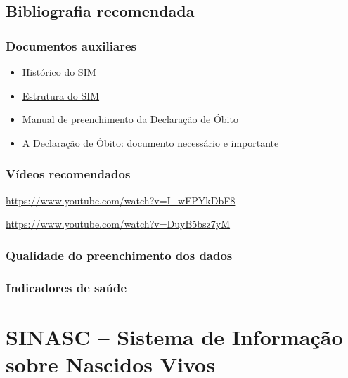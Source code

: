 \documentclass[
  letterpaper,
  DIV=11,
  numbers=noendperiod]{scrreprt}
\providecommand{\tightlist}{%
  \setlength{\itemsep}{0pt}\setlength{\parskip}{0pt}}\usepackage{longtable,booktabs,array}
\begin{document}
\section{Bibliografia recomendada}\label{bibliografia-recomendada}

\subsection{Documentos auxiliares}\label{documentos-auxiliares}

\begin{itemize}
\tightlist
\item
  \href{assets/sim/INTRO.pdf}{Histórico do SIM}
\item
  \href{assets/sim/Estrutura_SIM_para_CD.pdf}{Estrutura do SIM}
\item
  \href{assets/sim/declaracao-obito-manual-instrucoes-preenchimento.pdf}{Manual
  de preenchimento da Declaração de Óbito}
\item
  \href{assets/sim/a-declaracao-de-obito-documento-necessario-e-importante.pdf}{A
  Declaração de Óbito: documento necessário e importante}
\end{itemize}

\subsection{Vídeos recomendados}\label{vuxeddeos-recomendados}

\url{https://www.youtube.com/watch?v=I_wFPYkDbF8}

\url{https://www.youtube.com/watch?v=DuyB5bsz7yM}

\subsection{Qualidade do preenchimento dos
dados}\label{qualidade-do-preenchimento-dos-dados}

\subsection{Indicadores de saúde}\label{indicadores-de-sauxfade}


\chapter{SINASC -- Sistema de Informação sobre Nascidos
Vivos}\label{sinasc-sistema-de-informauxe7uxe3o-sobre-nascidos-vivos}
\end{document}
